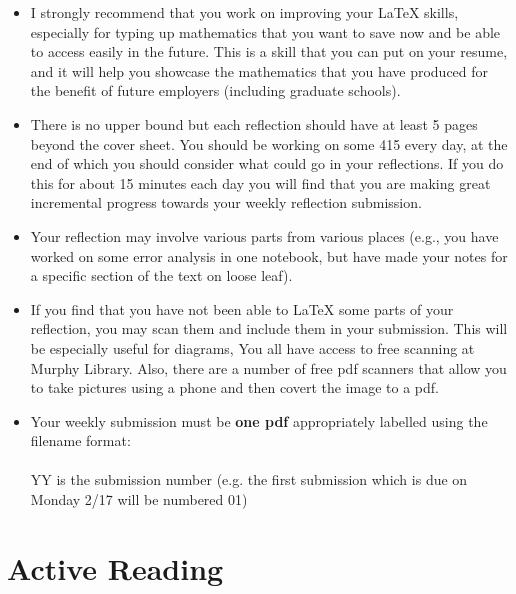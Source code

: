 \documentclass[10pt]{article}
\begin{document}
\begin{itemize}

\item I strongly recommend that you work on improving your LaTeX skills, especially for typing up mathematics that you want to save now and be able to access easily in the future. This is a skill that you can put on your resume, and it will help you showcase the mathematics that you have produced for the benefit of future employers (including graduate schools).

\item There is no upper bound but each reflection should have at least 5 pages beyond the cover sheet. You should be working on some 415 every day, at the end of which you should consider what could go in your reflections. If you do this for about 15 minutes each day you will find that you are making great incremental progress towards your weekly reflection submission. 

\item Your reflection may involve various parts from various places (e.g., you have worked on some error analysis in one notebook, but have made your notes for a specific section of the text on loose leaf).

\item If you find that you have not been able to LaTeX some parts of your reflection, you may scan them and include them in your submission. This will be especially useful for diagrams, You all have access to free scanning at Murphy Library. Also, there are a number of free pdf scanners that allow you to take pictures using a phone and then covert the image to a pdf.

\item Your weekly submission must be {\bf one pdf}  appropriately labelled using the filename format:\\
\phantom{XXXXXXXXXXXXXXXXXX}{\bf LastName\_FirstName\_MTH\_415\_S2020\_Reflect\_YY.pdf}\\
YY is the submission number (e.g. the first submission which is due on Monday 2/17 will be numbered 01)



\end{itemize}

\newpage

\section{Active Reading}
\end{document}
